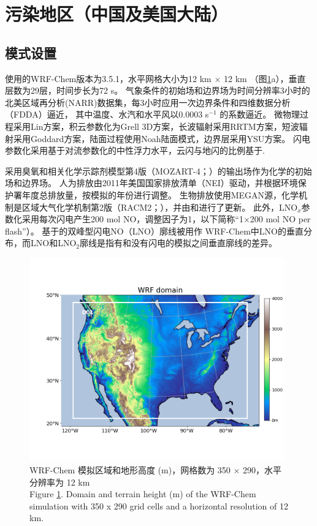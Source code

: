 \section{污染地区（中国及美国大陆）}

\subsection{模式设置} \label{sec:model_settings}

使用的WRF-Chem版本为3.5.1，水平网格大小为12 km $\times$ 12 km （图\ref{fig:us_domain}a），垂直层数为29层，时间步长为72 s。
气象条件的初始场和边界场为时间分辨率3小时的北美区域再分析(NARR)数据集，每3小时应用一次边界条件和四维数据分析（FDDA）逼近，
其中温度、水汽和水平风以0.0003 s$^{-1}$ 的系数逼近\citep{Laughner.2017}。
微物理过程采用Lin方案\citep{Lin.1983}，积云参数化为Grell 3D方案\citep{Grell.1993a,Grell.2002a}，长波辐射采用RRTM方案\citep{Iacono.2008}，短波辐射采用Goddard方案，陆面过程使用Noah陆面模式\citep{Koren.1999}，边界层采用YSU方案\citep{Hong.2006}。
闪电参数化采用基于对流参数化的中性浮力水平\citep{Pickering.1992}，云闪与地闪的比例基于\citet{Boccippio.2001}.

采用臭氧和相关化学示踪剂模型第4版（MOZART-4；\citet{Emmons.2010}）的输出场作为化学的初始场和边界场。
人为排放由2011年美国国家排放清单（NEI）驱动，并根据环境保护署年度总排放量，按模拟的年份进行调整\citep{EPA.2015}。
生物排放使用MEGAN源，化学机制是区域大气化学机制第2版（RACM2；\citet{Goliff.2013}），并由\citet{Browne.2014}和\citet{Schwantes.2015}进行了更新。
此外，LNO$_x$参数化采用每次闪电产生200 mol NO，调整因子为1，以下简称“1$\times$200 mol NO per flash”）。
基于\citet{Ott.2010}的双峰型闪电NO（LNO）廓线\citep{Laughner.2017}被用作 WRF-Chem中LNO的垂直分布，而LNO和LNO$_2$廓线是指有和没有闪电的模拟之间垂直廓线的差异。


\begin{figure}[!htbp]
\centering
\includegraphics[width=11cm]{./figures/us_domain.png}
\caption{WRF-Chem 模拟区域和地形高度 (m)，网格数为 350 $\times$ 290，水平分辨率为 12 km \\
Figure \ref{fig:us_domain}. Domain and terrain height (m) of the WRF-Chem simulation with 350 x 290 grid cells and a horizontal resolution of 12 km.}
\label{fig:us_domain}
\end{figure}


